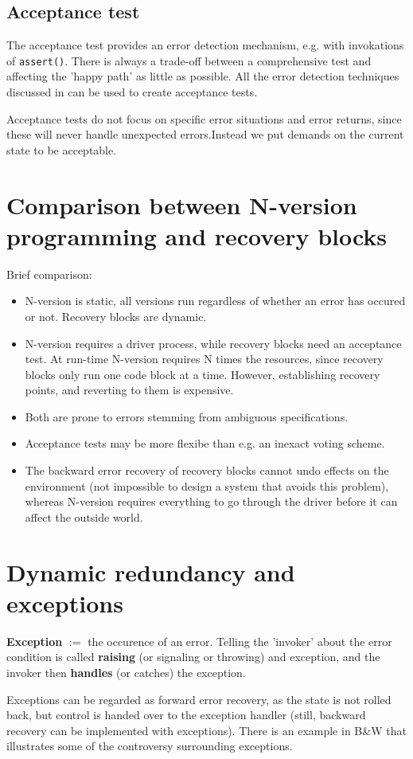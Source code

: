 \subsection{Acceptance test}
The acceptance test provides an error detection mechanism, e.g. with invokations of \texttt{assert()}. There is always a trade-off between a comprehensive test and affecting the 'happy path' as little as possible. All the error detection techniques discussed in  can be used to create acceptance tests.

Acceptance tests do not focus on specific error situations and error returns, since these will never handle unexpected errors.Instead we put demands on the current state to be acceptable.

\section{Comparison between N-version programming and recovery blocks}
Brief comparison:
\begin{itemize}
    \item N-version is static, all versions run regardless of whether an error has occured or not. Recovery blocks are dynamic.
    \item N-version requires a driver process, while recovery blocks need an acceptance test. At run-time N-version requires N times the resources, since recovery blocks only run one code block at a time. However, establishing recovery points, and reverting to them is expensive.
    \item Both are prone to errors stemming from ambiguous specifications.
    \item Acceptance tests may be more flexibe than e.g. an inexact voting scheme. 
    \item The backward error recovery of recovery blocks cannot undo effects on the environment (not impossible to design a system that avoids this problem), whereas N-version requires everything to go through the driver before it can affect the outside world.
\end{itemize}

\section{Dynamic redundancy and exceptions}
\textbf{Exception} $:=$ the occurence of an error. Telling the 'invoker' about the error condition is called \textbf{raising} (or signaling or throwing) and exception, and the invoker then \textbf{handles} (or catches) the exception. 

Exceptions can be regarded as forward error recovery, as the state is not rolled back, but control is handed over to the exception handler (still, backward recovery can be implemented with exceptions). There is an example in B\&W that illustrates some of the controversy surrounding exceptions.